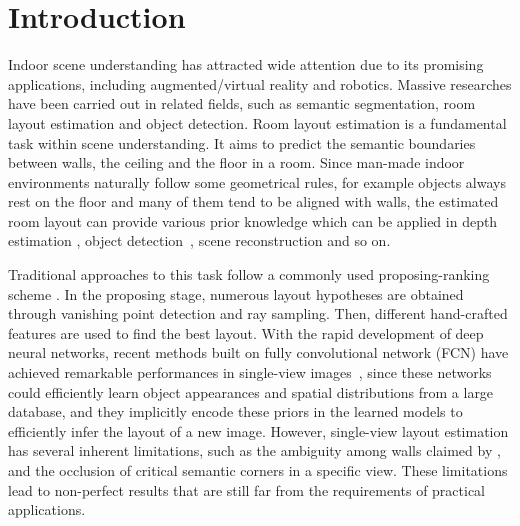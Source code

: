 \section{Introduction}

Indoor scene understanding has attracted wide attention due to its promising applications, including augmented/virtual reality and robotics. Massive researches have been carried out in related fields, such as semantic segmentation, room layout estimation and object detection. 
Room layout estimation is a fundamental task within scene understanding. It aims to predict the semantic boundaries between walls, the ceiling and the floor in a room. 
Since man-made indoor environments naturally follow some geometrical rules, for example objects always rest on the floor and many of them tend to be aligned with walls, the estimated room layout can provide various prior knowledge which can be applied in depth estimation \cite{eigen2014depth}, object detection~\cite{hedau2010thinking}, scene reconstruction \cite{lee2017joint} and so on.

Traditional approaches to this task follow a commonly used proposing-ranking scheme \cite{hedau2009recovering,wang2013discriminative,gupta2010estimating,hedau2010thinking}. In the proposing stage, numerous layout hypotheses are obtained through vanishing point detection and ray sampling. Then, different hand-crafted features are used to find the best layout. 
With the rapid development of deep neural networks, recent methods built on fully convolutional network (FCN) have achieved remarkable performances in single-view images~\cite{mallya2015learning,dasgupta2016delay,ren2016coarse,zhao2017physics,LeeRoomNet17}, since these networks could efficiently learn object appearances and spatial distributions from a large database, and they implicitly encode these priors in the learned models to efficiently infer the layout of a new image. 
%
However, single-view layout estimation has several inherent limitations, such as the ambiguity among walls claimed by \cite{dasgupta2016delay}, and the occlusion of critical semantic corners in a specific view. These limitations lead to non-perfect results that are still far from the requirements of practical applications.

